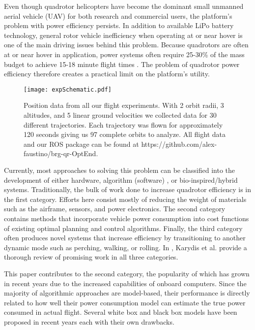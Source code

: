
Even though quadrotor helicopters have become the dominant small unmanned aerial vehicle (UAV) for both research and commercial users, the platform's problem with power efficiency persists. In addition to available LiPo battery technology, general rotor vehicle inefficiency when operating at or near hover \cite{leishman2006principles} is one of the main driving issues behind this problem. Because quadrotors are often at or near hover in application, power systems often require 25-30\% of the mass budget to achieve 15-18 minute flight times \cite{kumar2012opportunities}. The problem of quadrotor power efficiency therefore creates a practical limit on the platform's utility.

\begin{figure}[t]
	\label{fig:QuadAction}
	\centering
	\texttt{[image: expSchematic.pdf]}
	\caption{Position data from all our flight experiments. With 2 orbit radii, 3 altitudes, and 5 linear ground velocities we collected data for 30 different trajectories. Each trajectory was flown for approximately 120 seconds giving us 97 complete orbits to analyze. All flight data and our ROS package can be found at https://github.com/alex-faustino/brg-qr-OptEnd.}
\end{figure}

Currently, most approaches to solving this problem can be classified into the development of either hardware, algorithm (software) \cite{di2015energy,ware2016analysis,tagliabue2019model}, or bio-inspired/hybrid systems. Traditionally, the bulk of work done to increase quadrotor efficiency is in the first category. Efforts here consist mostly of reducing the weight of materials such as the airframe, sensors, and power electronics. The second category contains methods that incorporate vehicle power consumption into cost functions of existing optimal planning and control algorithms. Finally, the third category often produces novel systems that increase efficiency by transitioning to another dynamic mode such as perching, walking, or rolling. In \cite{karydis2017energetics}, Karydis et al. provide a thorough review of promising work in all three categories. 

This paper contributes to the second category, the popularity of which has grown in recent years due to the increased capabilities of onboard computers. Since the majority of algorithmic approaches are model-based, their performance is directly related to how well their power consumption model can estimate the true power consumed in actual flight. Several white box \cite{liu2017power, bezzo2016online} and black box \cite{di2015energy, prasetia2019mission} models have been proposed in recent years each with their own drawbacks. 

